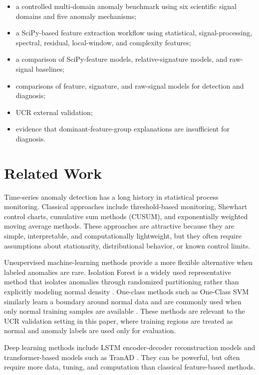 \begin{itemize}
    \item a controlled multi-domain anomaly benchmark using six scientific signal domains and five anomaly mechanisms;
    \item a SciPy-based feature extraction workflow using statistical, signal-processing, spectral, residual, local-window, and complexity features;
    \item a comparison of SciPy-feature models, relative-signature models, and raw-signal baselines;
    \item comparisons of feature, signature, and raw-signal models for detection and diagnosis;
    \item UCR external validation;
    \item evidence that dominant-feature-group explanations are insufficient for diagnosis.
\end{itemize}

\section{Related Work}

Time-series anomaly detection has a long history in statistical process monitoring. Classical approaches include threshold-based monitoring, Shewhart control charts, cumulative sum methods (CUSUM), and exponentially weighted moving average methods. These approaches are attractive because they are simple, interpretable, and computationally lightweight, but they often require assumptions about stationarity, distributional behavior, or known control limits.

Unsupervised machine-learning methods provide a more flexible alternative when labeled anomalies are rare. Isolation Forest is a widely used representative method that isolates anomalies through randomized partitioning rather than explicitly modeling normal density \citep{liu2008isolation}. One-class methods such as One-Class SVM similarly learn a boundary around normal data and are commonly used when only normal training samples are available \citep{scholkopf2001estimating}. These methods are relevant to the UCR validation setting in this paper, where training regions are treated as normal and anomaly labels are used only for evaluation.

Deep learning methods include LSTM encoder-decoder reconstruction models \citep{malhotra2016lstm} and transformer-based models such as TranAD \citep{tuli2022tranad}. They can be powerful, but often require more data, tuning, and computation than classical feature-based methods.

